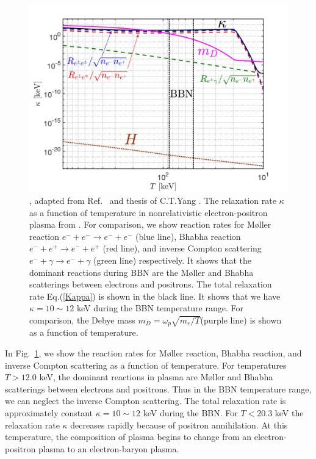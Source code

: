 \begin{figure}[ht]
\begin{center}
\includegraphics[width=\linewidth]{./plots/May152023Kappa_EPPlasma}
\caption{, adapted from Ref.~\cite{Grayson:2023flr} and thesis of C.T.Yang \cite{Yang:2024ret}. The relaxation rate $\kappa$ as a function of temperature in nonrelativistic electron-positron plasma from \cite{Grayson:2023flr}. For comparison, we show  reaction rates  for M{\o}ller reaction $e^-+e^-\to e^-+e^-$ (blue line), Bhabha reaction $e^-+e^+\to e^-+e^+$ (red line), and inverse Compton scattering $e^-+\gamma\to e^-+\gamma$ (green line) respectively. It shows that the dominant reactions during BBN are the M{\o}ller and Bhabha scatterings between electrons and positrons. The total relaxation rate Eq.(\ref{Kappa}) is shown in the black line. It shows that we have $\kappa=10\sim12$ keV during the BBN temperature range. For comparison, the Debye mass $m_D=\omega_{p}\sqrt{m_e/T}$(purple line) is shown as a function of temperature.
}
\label{RelaxationRate_fig}
\end{center}
\end{figure}

In Fig.~\ref{RelaxationRate_fig}, we show the reaction rates for M{\o}ller reaction, Bhabha reaction, and inverse Compton scattering as a function of temperature. For temperatures $T>12.0$ keV, the dominant reactions in plasma are M{\o}ller and Bhabha scatterings between electrons and positrons. Thus in the BBN temperature range, we can neglect the inverse Compton scattering. The total relaxation rate is approximately constant $\kappa=10\sim12$ keV during the BBN. For $T<20.3$ keV the relaxation rate $\kappa$ decreases rapidly because of positron annihilation. At this temperature, the composition of plasma begins to change from an electron-positron plasma to an electron-baryon plasma.


